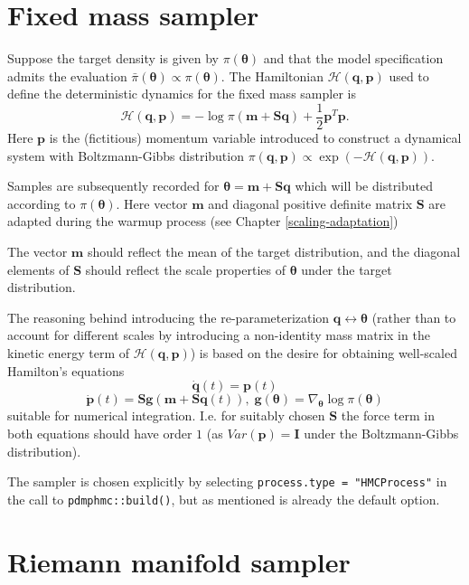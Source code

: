\documentclass[
]{book}
\begin{document}
\hypertarget{fixed-mass-sampler}{%
\section{Fixed mass sampler}\label{fixed-mass-sampler}}

Suppose the target density is given by \(\pi (\boldsymbol \theta)\) and that the model specification admits the evaluation \(\bar \pi(\boldsymbol \theta) \propto \pi (\boldsymbol \theta)\). The Hamiltonian \(\mathcal H(\mathbf q,\mathbf p)\) used to define the deterministic dynamics for the fixed mass sampler is
\[
\mathcal H(\mathbf q,\mathbf p) = -\log \pi(\mathbf m + \mathbf S \mathbf q) + \frac{1}{2} \mathbf p^T \mathbf p.
\]
Here \(\mathbf p\) is the (fictitious) momentum variable introduced to construct a dynamical system with Boltzmann-Gibbs distribution \(\pi(\mathbf q, \mathbf p) \propto \exp(-\mathcal H(\mathbf q,\mathbf p))\).

Samples are subsequently recorded for \(\boldsymbol \theta=\mathbf m + \mathbf S \mathbf q\) which will be distributed according to \(\pi(\boldsymbol \theta)\). Here vector \(\mathbf m\) and diagonal positive definite matrix \(\mathbf S\) are adapted during the warmup process (see Chapter \ref{scaling-adaptation})

The vector \(\mathbf m\) should reflect the mean of the target distribution, and the diagonal elements of \(\mathbf S\) should reflect the scale properties of \(\boldsymbol \theta\) under the target distribution.

The reasoning behind introducing the re-parameterization \(\mathbf q \leftrightarrow \boldsymbol \theta\) (rather than to account for different scales by introducing a non-identity mass matrix in the kinetic energy term of \(\mathcal H(\mathbf q,\mathbf p)\))
is based on the desire for obtaining well-scaled Hamilton's equations
\[
\dot{ \mathbf q}(t) = \mathbf p(t)
\]
\[
\dot{\mathbf p}(t) = \mathbf S \mathbf g(\mathbf m+\mathbf S \mathbf q(t)), \; \mathbf g(\boldsymbol \theta) = \nabla_{\boldsymbol \theta}\log \pi (\boldsymbol \theta)
\]
suitable for numerical integration. I.e. for suitably chosen \(\mathbf S\) the force term in both equations should have order \(1\) (as \(Var(\mathbf p)=\mathbf I\) under the Boltzmann-Gibbs distribution).

The sampler is chosen explicitly by selecting \texttt{process.type\ =\ "HMCProcess"} in the call to \texttt{pdmphmc::build()}, but as mentioned is already the default option.

\hypertarget{Riemann-manifold}{%
\section{Riemann manifold sampler}\label{Riemann-manifold}}
\end{document}
